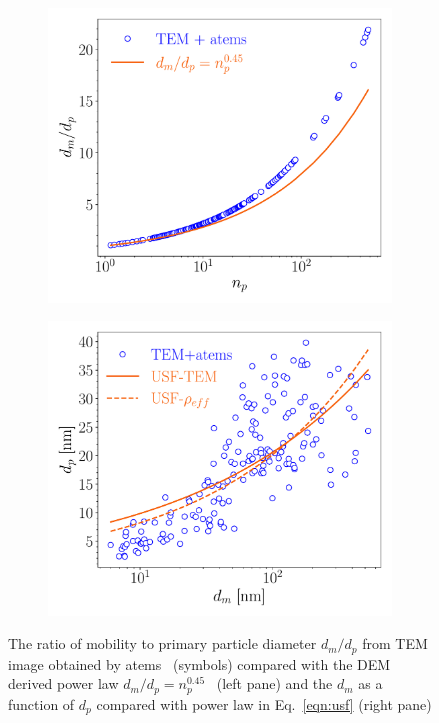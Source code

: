 \begin{figure}[H]
	\centering
	\begin{subfigure}[t]{0.32\textwidth}
		\includegraphics[width=1\textwidth]{Figures/Results/Shocktube/Stanford/TEM/dm_scalelaw.pdf}
	\end{subfigure}
	\begin{subfigure}[t]{0.32\textwidth}
		\includegraphics[width=1\textwidth]{Figures/Results/Shocktube/Stanford/TEM/dmdp_scalelaw.pdf}
	\end{subfigure}
	\caption{The ratio of mobility to primary particle diameter $d_m/d_p$ from TEM image obtained by atems~\citep{sipkens2021using} (symbols) compared with the DEM derived power law $d_m/d_p=n_p^{0.45}$~\citep{Kelesidis2017} (left pane) and the $d_m$ as a function of $d_p$ compared with power law in Eq.~\eqref{eqn:usf} (right pane)} 
	\label{fig:shocktube_TEM_powerlaws} 
\end{figure}

